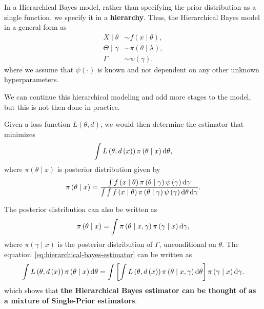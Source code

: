 In a Hierarchical Bayes model, rather than specifying the prior distribution as a single function, we specify it in a \textbf{hierarchy}. Thus, the Hierarchical Bayes model in a general form as
\begin{equation}
	\begin{aligned}
		X\mid\theta      & \sim f\left(x\mid\theta\right),         \\
		\Theta\mid\gamma & \sim \pi\left(\theta\mid\lambda\right), \\
		\Gamma           & \sim \psi\left(\gamma\right),
	\end{aligned}
	\label{eq:hierarchical-bayes}
\end{equation}
where we assume that $\psi\left(\cdot\right)$ is known and not dependent on any other unknown hyperparameters.

\begin{remark}
	We can continue this hierarchical modeling and add more stages to the model, but this is not then done in practice.
\end{remark}

Given a loss function $L\left(\theta,d\right)$, we would then determine the estimator that minimizes
\begin{equation} \label{eq:hierarchical-bayes-estimator}
	\int L\left(\theta,d\left(x\right)\right)\pi\left(\theta\mid x\right)\mathop{}\!\mathrm{d}\theta,
\end{equation}
where $\pi\left(\theta\mid x\right)$ is posterior distribution given by
\begin{equation*}
	\pi\left(\theta\mid x\right)=\frac{\int f\left(x\mid\theta\right)\pi\left(\theta\mid\gamma\right)\psi\left(\gamma\right)\mathop{}\!\mathrm{d}\gamma}{\int\int f\left(x\mid\theta\right)\pi\left(\theta\mid\gamma\right)\psi\left(\gamma\right)\mathop{}\!\mathrm{d}\theta\mathop{}\!\mathrm{d}\gamma}.
\end{equation*}

\begin{remark}
	The posterior distribution can also be written as
	\begin{equation*}
		\pi\left(\theta\mid x\right)=\int\pi\left(\theta\mid x,\gamma\right)\pi\left(\gamma\mid x\right)\mathop{}\!\mathrm{d}\gamma,
	\end{equation*}
	where $\pi\left(\gamma\mid x\right)$ is the posterior distribution of $\Gamma$, unconditional on $\theta$. The equation~\ref{eq:hierarchical-bayes-estimator} can be written as
	\begin{equation*}
		\int L\left(\theta,d\left(x\right)\right)\pi\left(\theta\mid x\right)\mathop{}\!\mathrm{d}\theta = \int\left[\int L\left(\theta,d\left(x\right)\right)\pi\left(\theta\mid x,\gamma\right)\mathop{}\!\mathrm{d}\theta\right]\pi\left(\gamma\mid x\right)\mathop{}\!\mathrm{d}\gamma.
	\end{equation*}
	which shows that \textbf{the Hierarchical Bayes estimator can be thought of as a mixture of Single-Prior estimators}.
\end{remark}

